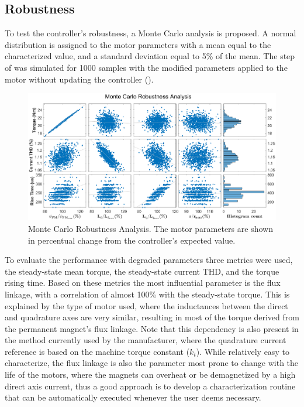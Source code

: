 \documentclass[9pt,conference]{IEEEtran}
\begin{document}
\subsection{Robustness}

To test the controller's robustness, a Monte Carlo analysis is proposed. A normal distribution is assigned to the motor parameters with a mean equal to the characterized value, and a standard deviation equal to 5\% of the mean. The step of  was simulated for 1000 samples with the modified parameters applied to the motor without updating the controller ().

    \begin{figure}[htb]
        \centering
        \includegraphics[width=0.8\linewidth]{Figures/MonteCarlo.eps}
        \caption[Monte Carlo Robustness Analysis.]{Monte Carlo Robustness Analysis. The motor parameters are shown in percentual change from the controller's expected value.}
        \label{fig:montecarlo} %
    \end{figure}

To evaluate the performance with degraded parameters three metrics were used, the steady-state mean torque, the steady-state current THD, and the torque rising time. Based on these metrics the most influential parameter is the flux linkage, with a correlation of almost 100\% with the steady-state torque. This is explained by the type of motor used, where the inductances between the direct and quadrature axes are very similar, resulting in most of the torque derived from the permanent magnet's flux linkage. Note that this dependency is also present in the method currently used by the manufacturer, where the quadrature current reference is based on the machine torque constant ($k_t$). 
While relatively easy to characterize, the flux linkage is also the parameter most prone to change with the life of the motors, where the magnets can overheat or be demagnetized by a high direct axis current, thus a good approach is to develop a characterization routine that can be automatically executed whenever the user deems necessary.
\end{document}
